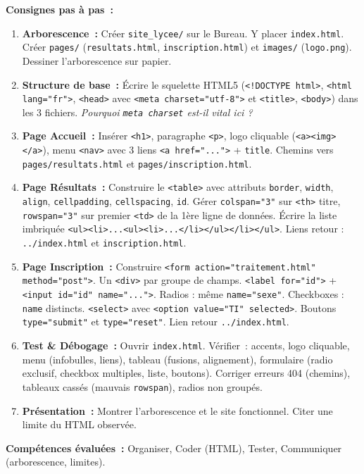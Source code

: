 \documentclass[11pt]{article}
\begin{document}
\begin{experience}
\textbf{Consignes pas à pas~:}
\begin{enumerate}
\item \textbf{Arborescence~:} Créer \texttt{site\_lycee/} sur le Bureau. Y placer \texttt{index.html}. Créer \texttt{pages/} (\texttt{resultats.html}, \texttt{inscription.html}) et \texttt{images/} (\texttt{logo.png}). Dessiner l'arborescence sur papier.
\item \textbf{Structure de base~:} Écrire le squelette HTML5 (\texttt{<!DOCTYPE html>}, \texttt{<html lang="fr">}, \texttt{<head>} avec \texttt{<meta charset="utf-8">} et \texttt{<title>}, \texttt{<body>}) dans les 3 fichiers. \emph{Pourquoi \texttt{meta charset} est-il vital ici ?}
\item \textbf{Page Accueil~:} Insérer \texttt{<h1>}, paragraphe \texttt{<p>}, logo cliquable (\texttt{<a><img></a>}), menu \texttt{<nav>} avec 3 liens \texttt{<a href="...">} + \texttt{title}. Chemins vers \texttt{pages/resultats.html} et \texttt{pages/inscription.html}.
\item \textbf{Page Résultats~:} Construire le \texttt{<table>} avec attributs \texttt{border}, \texttt{width}, \texttt{align}, \texttt{cellpadding}, \texttt{cellspacing}, \texttt{id}. Gérer \texttt{colspan="3"} sur \texttt{<th>} titre, \texttt{rowspan="3"} sur premier \texttt{<td>} de la 1ère ligne de données. Écrire la liste imbriquée \texttt{<ul><li>...<ul><li>...</li></ul></li></ul>}. Liens retour : \texttt{../index.html} et \texttt{inscription.html}.
\item \textbf{Page Inscription~:} Construire \texttt{<form action="traitement.html" method="post">}. Un \texttt{<div>} par groupe de champs. \texttt{<label for="id">} + \texttt{<input id="id" name="...">}. Radios : même \texttt{name="sexe"}. Checkboxes : \texttt{name} distincts. \texttt{<select>} avec \texttt{<option value="TI" selected>}. Boutons \texttt{type="submit"} et \texttt{type="reset"}. Lien retour \texttt{../index.html}.
\item \textbf{Test \& Débogage~:} Ouvrir \texttt{index.html}. Vérifier~: accents, logo cliquable, menu (infobulles, liens), tableau (fusions, alignement), formulaire (radio exclusif, checkbox multiples, liste, boutons). Corriger erreurs 404 (chemins), tableaux cassés (mauvais \texttt{rowspan}), radios non groupés.
\item \textbf{Présentation~:} Montrer l'arborescence et le site fonctionnel. Citer une limite du HTML observée.
\end{enumerate}

\textbf{Compétences évaluées~:} Organiser, Coder (HTML), Tester, Communiquer (arborescence, limites).
\end{experience}
\end{document}

